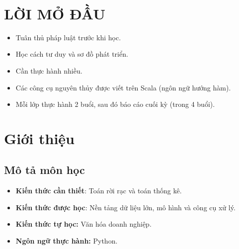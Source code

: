 

\newcommand{\tab}{\hspace{\parindent}}

\begin{titlepage}
\bordertitle
\begin{center}
\vspace{\fill} \maintitle \\ \vspace{\fill} \bottitle
\end{center}
\end{titlepage}
\newpage
{}
\tableofcontents
\thispagestyle{empty}
\newpage
\chapter*{ LỜI MỞ ĐẦU }
\thispagestyle{empty}
\vspace{\fill}
\begin{itemize}
	\item Tuân thủ pháp luật trước khi học.
	\item Học cách tư duy và sơ đồ phát triển.
	\item Cần thực hành nhiều.
	\item Các công cụ nguyên thủy được viết trên Scala (ngôn ngữ hướng hàm).
	\item Mỗi lớp thực hành 2 buổi, sau đó báo cáo cuối kỳ (trong 4 buổi).
\end{itemize}
\vspace{\fill}
\newpage
\setcounter{page}{1}
\chapter{ Giới thiệu }
\section{ Mô tả môn học }
\begin{itemize}
    \item \textbf{Kiến thức cần thiết}: Toán rời rạc và toán thống kê.
    \item \textbf{Kiến thức được học}: Nền tảng dữ liệu lớn, mô hình và công 
    cụ xử lý.
    \item \textbf{Kiến thức tự học:} Văn hóa doanh nghiệp.
    \item \textbf{Ngôn ngữ thực hành:} Python.
\end{itemize}
